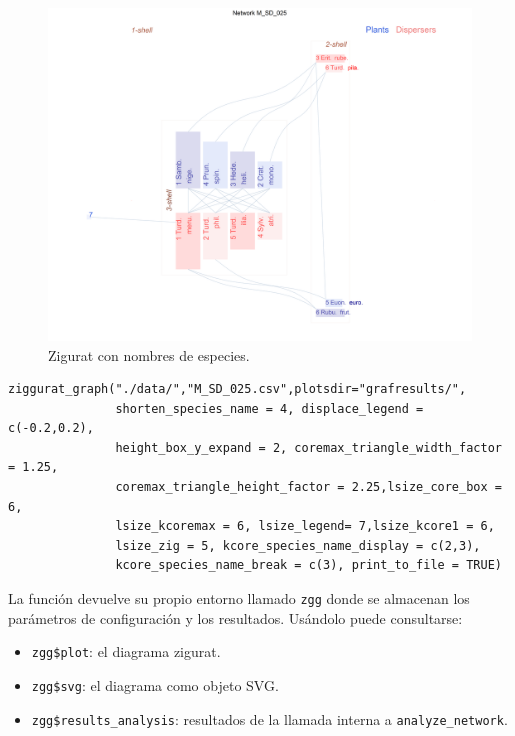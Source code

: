 \begin{figure}[hp!]
\centering
\includegraphics[scale=0.45]{ManFigs/M_SD_025_ziggurat.png}
\caption {Zigurat con nombres de especies.}
\label{fig:AKMAN_ziggurat_025}
\end{figure}

\fontsize{3.5mm}{3.5mm}\selectfont
\begin{verbatim}
ziggurat_graph("./data/","M_SD_025.csv",plotsdir="grafresults/",
               shorten_species_name = 4, displace_legend = c(-0.2,0.2),
               height_box_y_expand = 2, coremax_triangle_width_factor = 1.25,
               coremax_triangle_height_factor = 2.25,lsize_core_box = 6,
               lsize_kcoremax = 6, lsize_legend= 7,lsize_kcore1 = 6, 
               lsize_zig = 5, kcore_species_name_display = c(2,3), 
               kcore_species_name_break = c(3), print_to_file = TRUE)

\end{verbatim}
\normalsize

\clearpage

\noindent La función devuelve su propio entorno llamado \texttt{zgg} donde se almacenan los parámetros de configuración y los resultados. Usándolo puede consultarse:

\begin{itemize}

\item \texttt{zgg\$plot}:  el diagrama zigurat.

\item \texttt{zgg\$svg}: el diagrama como objeto SVG.

\item \texttt{zgg\$results\_analysis}: resultados de la llamada interna a \texttt{analyze\_network}.

\end{itemize}
 

